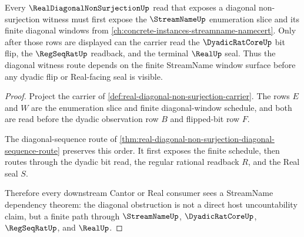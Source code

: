 \begin{theorem}
\label{thm:real-diagonal-non-surjection-streamname-dependency}
Every $\RealDiagonalNonSurjectionUp$ read that exposes a diagonal non-surjection witness must first expose the $\StreamNameUp$ enumeration slice and its finite diagonal windows from \autoref{ch:concrete-instances-streamname-namecert}. Only after those rows are displayed can the carrier read the $\DyadicRatCoreUp$ bit flip, the $\RegSeqRatUp$ readback, and the terminal $\RealUp$ seal. Thus the diagonal witness route depends on the finite StreamName window surface before any dyadic flip or Real-facing seal is visible.
\end{theorem}
\begin{proof}
Project the carrier of \autoref{def:real-diagonal-non-surjection-carrier}. The rows $E$ and $W$ are the enumeration slice and finite diagonal-window schedule, and both are read before the dyadic observation row $B$ and flipped-bit row $F$.

The diagonal-sequence route of \autoref{thm:real-diagonal-non-surjection-diagonal-sequence-route} preserves this order. It first exposes the finite schedule, then routes through the dyadic bit read, the regular rational readback $R$, and the Real seal $S$.

Therefore every downstream Cantor or Real consumer sees a StreamName dependency theorem: the diagonal obstruction is not a direct host uncountability claim, but a finite path through $\StreamNameUp$, $\DyadicRatCoreUp$, $\RegSeqRatUp$, and $\RealUp$.
\end{proof}

